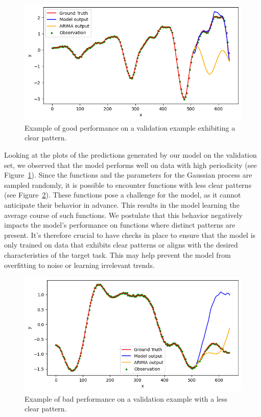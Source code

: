 \documentclass{article}
\theoremstyle{plain}
\theoremstyle{definition}
\theoremstyle{remark}
\begin{document}
\begin{figure}[h!]
    \centering
    \includegraphics[width=\linewidth]{assets/validation1.png}
    \caption{Example of good performance on a validation example exhibiting a clear pattern.}
    \label{fig:validation1}
\end{figure}
Looking at the plots of the predictions generated by our model on the validation set, we observed that the model performs well on data with high periodicity (see Figure~\ref{fig:validation1}). Since the functions and the parameters for the Gaussian process are sampled randomly, it is possible to encounter functions with less clear patterns (see Figure~\ref{fig:validation2}). These functions pose a challenge for the model, as it cannot anticipate their behavior in advance. This results in the model learning the average course of such functions. We postulate that this behavior negatively impacts the model's performance on functions where distinct patterns are present. It's therefore crucial to have checks in place to ensure that the model is only trained on data that exhibits clear patterns or aligns with the desired characteristics of the target task. This may help prevent the model from overfitting to noise or learning irrelevant trends.

 
\begin{figure}[h!]
    \centering
    \includegraphics[width=\linewidth]{assets/validation2.png}
    \caption{Example of bad performance on a validation example with a less clear pattern.}    \label{fig:validation2}
\end{figure}
\end{document}
